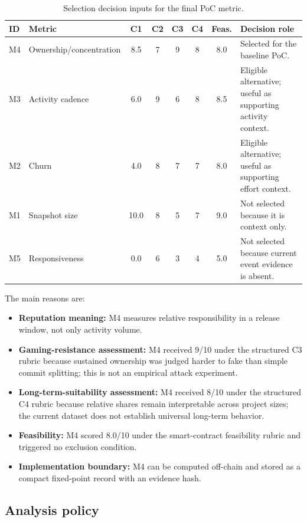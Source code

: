 \begin{table}[H]
\centering
\scriptsize
\renewcommand{\arraystretch}{1.08}
\begin{tabularx}{\textwidth}{p{1.0cm}p{3.5cm}cccccX}
\toprule
\textbf{ID} & \textbf{Metric} & \textbf{C1} & \textbf{C2} & \textbf{C3} & \textbf{C4} & \textbf{Feas.} & \textbf{Decision role} \\
\midrule
M4 & Ownership/concentration & 8.5 & 7 & 9 & 8 & 8.0 & Selected for the baseline PoC. \\
M3 & Activity cadence & 6.0 & 9 & 6 & 8 & 8.5 & Eligible alternative; useful as supporting activity context. \\
M2 & Churn & 4.0 & 8 & 7 & 7 & 8.0 & Eligible alternative; useful as supporting effort context. \\
M1 & Snapshot size & 10.0 & 8 & 5 & 7 & 9.0 & Not selected because it is context only. \\
M5 & Responsiveness & 0.0 & 6 & 3 & 4 & 5.0 & Not selected because current event evidence is absent. \\
\bottomrule
\end{tabularx}
\caption{Selection decision inputs for the final PoC metric.}
\label{tab:poc_selection_decision_inputs}
\end{table}

The main reasons are:
\begin{itemize}[leftmargin=*]
  \item \textbf{Reputation meaning:} M4 measures relative responsibility in a release window, not only activity volume.
  \item \textbf{Gaming-resistance assessment:} M4 received 9/10 under the structured C3 rubric because sustained ownership was judged harder to fake than simple commit splitting; this is not an empirical attack experiment.
  \item \textbf{Long-term-suitability assessment:} M4 received 8/10 under the structured C4 rubric because relative shares remain interpretable across project sizes; the current dataset does not establish universal long-term behavior.
  \item \textbf{Feasibility:} M4 scored 8.0/10 under the smart-contract feasibility rubric and triggered no exclusion condition.
  \item \textbf{Implementation boundary:} M4 can be computed off-chain and stored as a compact fixed-point record with an evidence hash.
\end{itemize}

\subsection{Analysis policy}
\label{sec:selected_metric_policy}

